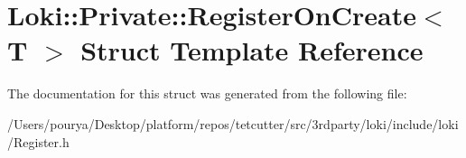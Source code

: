 \hypertarget{structLoki_1_1Private_1_1RegisterOnCreate}{}\section{Loki\+:\+:Private\+:\+:Register\+On\+Create$<$ T $>$ Struct Template Reference}
\label{structLoki_1_1Private_1_1RegisterOnCreate}


The documentation for this struct was generated from the following file\+:\begin{DoxyCompactItemize}
\item 
/\+Users/pourya/\+Desktop/platform/repos/tetcutter/src/3rdparty/loki/include/loki/Register.\+h\end{DoxyCompactItemize}
